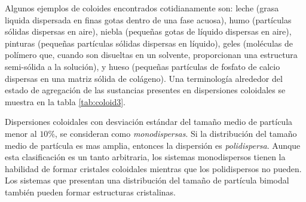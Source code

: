 Algunos ejemplos de coloides encontrados cotidianamente son: leche (grasa liquida dispersada en finas gotas dentro de una fase acuosa), humo (partículas sólidas dispersas en aire), niebla (pequeñas gotas de líquido dispersas en aire), pinturas (pequeñas partículas sólidas dispersas en líquido), geles (moléculas de polímero que, cuando son disueltas en un solvente, proporcionan una estructura semi-sólida a la solución), y hueso (pequeñas partículas de fosfato de calcio dispersas en una matriz sólida de colágeno). Una terminología alrededor del estado de agregación de las sustancias presentes en dispersiones coloidales se muestra en la tabla \autoref{tab:coloid3}.


Dispersiones coloidales con desviación estándar del tamaño medio de partícula menor al $10\%$, se consideran como \emph{monodispersas}. Si la distribución del tamaño medio de partícula es mas amplia, entonces la dispersión es \emph{polidispersa}. Aunque esta clasificación es un tanto arbitraria, los sistemas monodispersos tienen la habilidad de formar cristales coloidales mientras que los polidispersos no pueden. Los sistemas que presentan una distribución del tamaño de partícula bimodal también pueden formar estructuras cristalinas.


